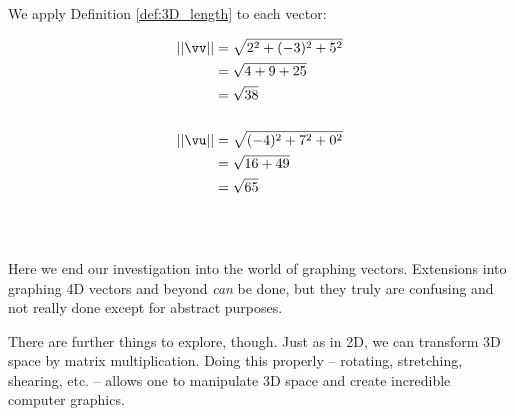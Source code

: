 {We apply Definition \ref{def:3D_length} to each vector:

\begin{align*}
||\vv|| 	&= \sqrt{2^2 + (-3)^2 + 5^2} \\
					&= \sqrt{4 + 9 + 25}\\
					&= \sqrt{38}\\
\\
||\vu|| &= \sqrt{(-4)^2 + 7^2 + 0^2}\\
				&= \sqrt{16+49}\\
				&= \sqrt{65}
\end{align*}
\ } \\ %

Here we end our investigation into the world of graphing vectors. Extensions into graphing 4D vectors and beyond \textit{can} be done, but they truly are confusing and not really done except for abstract purposes. 

There are further things to explore, though. Just as in 2D, we can transform 3D space by matrix multiplication. Doing this properly -- rotating, stretching, shearing, etc. -- allows one to manipulate 3D space and create incredible computer graphics. \\


\clearpage

